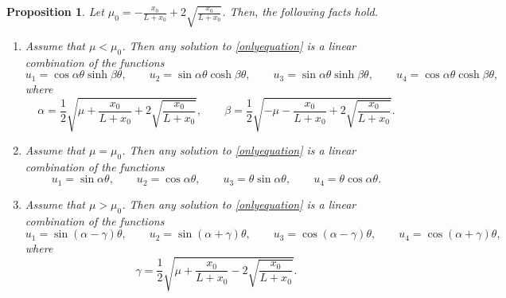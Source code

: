 \documentclass[11pt]{amsart}
\newtheorem{proposition}[theorem]{Proposition}
\theoremstyle{definition}
\theoremstyle{remark}
\numberwithin{equation}{section}
\begin{document}
\begin{proposition}\label{soluzgenrralestab}
Let $\mu_0=-\frac{x_0}{L+x_0}+2\sqrt{\frac{x_0}{L+x_0}}$. Then, the following facts hold.
\begin{enumerate}
	\item [(i)] Assume that $\mu<\mu_0$.
	Then any solution to \eqref{onlyequation} is a linear combination of the functions    \begin{equation}\label{soluzionicasocomplesso}
		u_1=\cos \alpha\theta\sinh\beta\theta,\qquad
		u_2=\sin \alpha\theta\cosh\beta\theta,\qquad
		u_3= \sin \alpha\theta\sinh\beta\theta,\qquad
		u_4=\cos \alpha\theta\cosh\beta\theta,
	\end{equation}
	where
	\begin{equation}\label{alfabetacomplesso}
		\alpha=\frac{1}{2}\sqrt{\mu+\frac{x_0}{L+x_0}+2\sqrt{\frac{x_0}{L+x_0}}},\qquad\beta=\frac{1}{2}\sqrt{-\mu-\frac{x_0}{L+x_0}+2\sqrt{\frac{x_0}{L+x_0}}}.
	\end{equation}
	\item [(ii)] Assume that $\mu=\mu_0$.
	Then any solution to \eqref{onlyequation} is a linear combination of the functions     \begin{equation}\label{soluzionicasocritico}
		u_1=\sin\alpha \theta,\qquad
		u_2=\cos \alpha\theta,\qquad
		u_3= \theta\sin \alpha\theta,\qquad
		u_4=\theta\cos \alpha\theta.
	\end{equation}
	\item [(iii)] Assume that $\mu>\mu_0$.
Then any solution to \eqref{onlyequation} is a linear combination of the functions
\begin{equation}\label{soluzionicasoreale}
	u_1=\sin\left(\alpha-\gamma\right) \theta,\qquad
	u_2=\sin \left(\alpha+\gamma\right)\theta,\qquad
	u_3= \cos (\alpha-\gamma)\theta,\qquad
	u_4=\cos (\alpha+\gamma)\theta,
\end{equation}
where
\begin{equation}\label{defigamma}
	\gamma=\frac{1}{2}\sqrt{\mu+\frac{x_0}{L+x_0}-2\sqrt{\frac{x_0}{L+x_0}}}.
\end{equation}
\end{enumerate}
\end{proposition}
\end{document}
